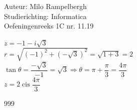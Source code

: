 \documentclass[a4paper]{article}
\begin{document}
\noindent \large Auteur: Milo Rampelbergh \\
\noindent \large Studierichting: Informatica\\
\noindent \large Oefeningenreeks 1C nr. 11.19\\

\medskip

\normalsize


$ z = -1-i \sqrt{3} $\\

$ r = \sqrt{(-1)^2 + (-\sqrt{3})^2} = \sqrt{1+3} = 2 $ \\

$ \tan{\theta} = \dfrac{-\sqrt{3}}{-1} = \sqrt{3} \Rightarrow \theta = \pi + \dfrac{\pi}{3} = \dfrac{4\pi}{3} $\\

$ z = 2 \operatorname{cis} \dfrac{4\pi}{3} $


\begin{thebibliography}{999}
\end{thebibliography}
\end{document}

